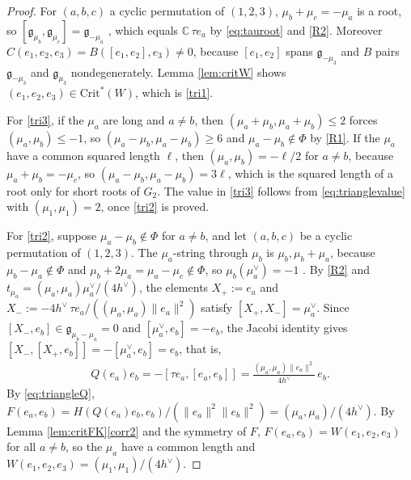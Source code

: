 \documentclass [leqno, 10pt]{amsart}
\theoremstyle{definition}
\numberwithin{equation}{section}
\newcommand{\g}{\mathfrak{g}}
\newcommand{\com}{\mathbb C}
\newcommand{\crtnt}{\mathrm{Crit}^*}
\newcommand{\hv}{h^\vee}
\newcommand{\norm}[1]{\lVert #1\rVert}
\newcommand{\qad}{Q}
\begin{document}
\begin{proof}
For $(a, b, c)$ a cyclic permutation of $(1, 2, 3)$, $\mu_{b} + \mu_{c} = -\mu_{a}$ is a root, so $[\g_{\mu_{b}}, \g_{\mu_{c}}] = \g_{-\mu_{a}}$ \cite[Proposition~8.4]{Humphreys}, which equals $\com\,\tau e_{a}$ by \eqref{eq:tauroot} and \ref{R2}. Moreover $C(e_{1}, e_{2}, e_{3}) = B([e_{1}, e_{2}], e_{3}) \neq 0$, because $[e_{1}, e_{2}]$ spans $\g_{-\mu_{3}}$ and $B$ pairs $\g_{-\mu_{3}}$ and $\g_{\mu_{3}}$ nondegenerately. Lemma \ref{lem:critW} shows $(e_{1}, e_{2}, e_{3}) \in \crtnt(W)$, which is \ref{tri1}.

For \ref{tri3}, if the $\mu_{a}$ are long and $a \neq b$, then $(\mu_{a} + \mu_{b}, \mu_{a} + \mu_{b}) \leq 2$ forces $(\mu_{a}, \mu_{b}) \leq -1$, so $(\mu_{a} - \mu_{b}, \mu_{a} - \mu_{b}) \geq 6$ and $\mu_{a} - \mu_{b} \notin \Phi$ by \ref{R1}. If the $\mu_{a}$ have a common squared length $\ell$, then $(\mu_{a}, \mu_{b}) = -\ell/2$ for $a \neq b$, because $\mu_{a} + \mu_{b} = -\mu_{c}$, so $(\mu_{a} - \mu_{b}, \mu_{a} - \mu_{b}) = 3\ell$, which is the squared length of a root only for short roots of $G_{2}$. The value in \ref{tri3} follows from \eqref{eq:trianglevalue} with $(\mu_{1}, \mu_{1}) = 2$, once \ref{tri2} is proved.

For \ref{tri2}, suppose $\mu_{a} - \mu_{b} \notin \Phi$ for $a \neq b$, and let $(a, b, c)$ be a cyclic permutation of $(1, 2, 3)$. The $\mu_{a}$-string through $\mu_{b}$ is $\mu_{b}, \mu_{b} + \mu_{a}$, because $\mu_{b} - \mu_{a} \notin \Phi$ and $\mu_{b} + 2\mu_{a} = \mu_{a} - \mu_{c} \notin \Phi$, so $\mu_{b}(\mu_{a}^{\vee}) = -1$ \cite[Proposition~8.4]{Humphreys}. By \ref{R2} and $t_{\mu_{a}} = (\mu_{a}, \mu_{a})\mu_{a}^{\vee}/(4\hv)$, the elements $X_{+} := e_{a}$ and $X_{-} := -4\hv\,\tau e_{a}/((\mu_{a}, \mu_{a})\norm{e_{a}}^{2})$ satisfy $[X_{+}, X_{-}] = \mu_{a}^{\vee}$. Since $[X_{-}, e_{b}] \in \g_{\mu_{b} - \mu_{a}} = 0$ and $[\mu_{a}^{\vee}, e_{b}] = -e_{b}$, the Jacobi identity gives $[X_{-}, [X_{+}, e_{b}]] = -[\mu_{a}^{\vee}, e_{b}] = e_{b}$, that is,
\begin{align}\label{eq:triangleQ}
\qad(e_{a})e_{b} = -[\tau e_{a}, [e_{a}, e_{b}]] = \frac{(\mu_{a}, \mu_{a})\norm{e_{a}}^{2}}{4\hv}\,e_{b}.
\end{align}
By \eqref{eq:triangleQ}, $F(e_{a}, e_{b}) = H(\qad(e_{a})e_{b}, e_{b})/(\norm{e_{a}}^{2}\norm{e_{b}}^{2}) = (\mu_{a}, \mu_{a})/(4\hv)$. By Lemma \ref{lem:critFK}\ref{corr2} and the symmetry of $F$, $F(e_{a}, e_{b}) = W(e_{1}, e_{2}, e_{3})$ for all $a \neq b$, so the $\mu_{a}$ have a common length and $W(e_{1}, e_{2}, e_{3}) = (\mu_{1}, \mu_{1})/(4\hv)$.


\end{proof}
\end{document}
